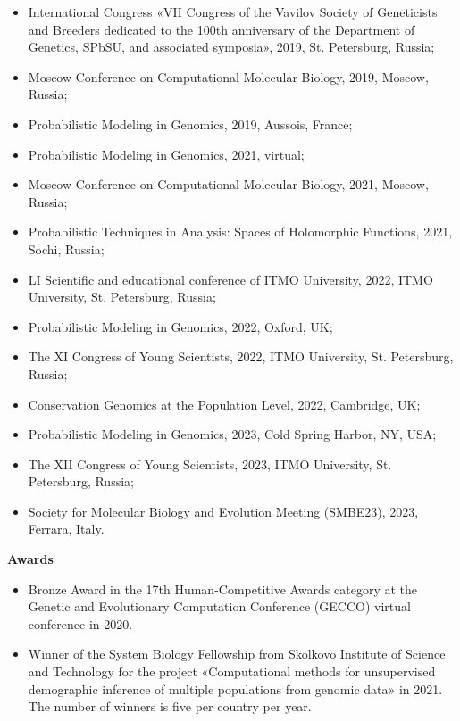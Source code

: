 \begin{itemize}
    \item International Congress «VII Congress of the Vavilov Society of Geneticists and Breeders dedicated to the 100th anniversary of the Department of Genetics, SPbSU, and associated symposia», 2019, St. Petersburg, Russia;
    \item Moscow Conference on Computational Molecular Biology, 2019, Moscow, Russia;
    \item Probabilistic Modeling in Genomics, 2019, Aussois, France;
    \item Probabilistic Modeling in Genomics, 2021, virtual;
    \item Moscow Conference on Computational Molecular Biology, 2021, Moscow, Russia;
    \item Probabilistic Techniques in Analysis: Spaces of Holomorphic Functions, 2021, Sochi, Russia;
    \item LI Scientific and educational conference of ITMO University, 2022, ITMO University, St. Petersburg, Russia;
    \item Probabilistic Modeling in Genomics, 2022, Oxford, UK;
    \item The XI Congress of Young Scientists, 2022, ITMO University, St. Petersburg, Russia;
    \item Conservation Genomics at the Population Level, 2022, Cambridge, UK;
    \item Probabilistic Modeling in Genomics, 2023, Cold Spring Harbor, NY, USA;   
    \item The XII Congress of Young Scientists, 2023, ITMO University, St. Petersburg, Russia;
    \item  Society for Molecular Biology and Evolution Meeting (SMBE23), 2023, Ferrara, Italy.\\
\end{itemize}

\textbf{Awards} 
\begin{itemize}
    \item Bronze Award in the 17th Human-Competitive Awards category at the Genetic and Evolutionary Computation Conference (GECCO) virtual conference in 2020.
    \item Winner of the System Biology Fellowship from Skolkovo Institute of Science and Technology for the project «Computational methods for unsupervised demographic inference of multiple populations from genomic data» in 2021. The number of winners is five per country per year.\\
\end{itemize}


